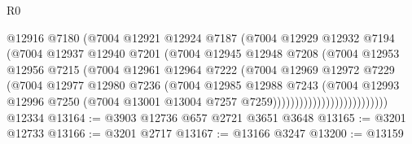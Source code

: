 \begin{lexlean}{R0}
\begin{coremodule}
                                  @12916
                                  @7180
                                  (@7004
                                    @12921
                                    @12924
                                    @7187
                                    (@7004
                                      @12929
                                      @12932
                                      @7194
                                      (@7004
                                        @12937
                                        @12940
                                        @7201
                                        (@7004
                                          @12945
                                          @12948
                                          @7208
                                          (@7004
                                            @12953
                                            @12956
                                            @7215
                                            (@7004
                                              @12961
                                              @12964
                                              @7222
                                              (@7004
                                                @12969
                                                @12972
                                                @7229
                                                (@7004
                                                  @12977
                                                  @12980
                                                  @7236
                                                  (@7004
                                                    @12985
                                                    @12988
                                                    @7243
                                                    (@7004
                                                      @12993
                                                      @12996
                                                      @7250
                                                      (@7004
                                                        @13001
                                                        @13004
                                                        @7257
                                                        @7259))))))))))))))))))))))))))
    @12334
@13164 := @3903 @12736 @657 @2721 @3651 @3648
@13165 := @3201 @12733
@13166 := @3201 @2717
@13167 := @13166 @3247
@13200 := @13159

\end{coremodule}
\end{lexlean}
